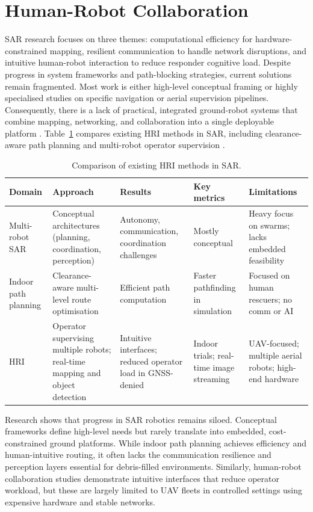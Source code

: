 \section{Human-Robot Collaboration}
\label{sec:lit_hri}

SAR research focuses on three themes: computational efficiency for hardware-constrained mapping, resilient communication to handle network disruptions, and intuitive human-robot interaction to reduce responder cognitive load. Despite progress in system frameworks and path-blocking strategies, current solutions remain fragmented. Most work is either high-level conceptual framing or highly specialised studies on specific navigation or aerial supervision pipelines. Consequently, there is a lack of practical, integrated ground-robot systems that combine mapping, networking, and collaboration into a single deployable platform \cite{queralta2020}. Table~\ref{tab:hri_compare} compares existing HRI methods in SAR, including clearance-aware path planning \cite{lee2023} and multi-robot operator supervision \cite{chan2023}.

\begin{table}[htbp]
\caption{Comparison of existing HRI methods in SAR.}
\label{tab:hri_compare}
\centering
\small
\begin{tabular}{p{2.2cm}p{2.2cm}p{2.2cm}p{1.8cm}p{2.2cm}}
\toprule
\textbf{Domain} & \textbf{Approach} & \textbf{Results} & \textbf{Key metrics} & \textbf{Limitations} \\
\midrule
Multi-robot SAR \cite{queralta2020} & Conceptual architectures (planning, coordination, perception) & Autonomy, communication, coordination challenges & Mostly conceptual & Heavy focus on swarms; lacks embedded feasibility \\
Indoor path planning \cite{lee2023} & Clearance-aware multi-level route optimisation & Efficient path computation & Faster pathfinding in simulation & Focused on human rescuers; no comm or AI \\
HRI \cite{chan2023} & Operator supervising multiple robots; real-time mapping and object detection & Intuitive interfaces; reduced operator load in GNSS-denied & Indoor trials; real-time image streaming & UAV-focused; multiple aerial robots; high-end hardware \\
\bottomrule
\end{tabular}
\end{table}

Research shows that progress in SAR robotics remains siloed. Conceptual frameworks define high-level needs but rarely translate into embedded, cost-constrained ground platforms. While indoor path planning achieves efficiency and human-intuitive routing, it often lacks the communication resilience and perception layers essential for debris-filled environments. Similarly, human-robot collaboration studies demonstrate intuitive interfaces that reduce operator workload, but these are largely limited to UAV fleets in controlled settings using expensive hardware and stable networks.

